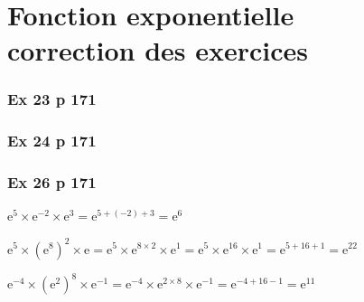 \documentclass[12pt,a4paper]{book}
\begin{document}
\graphicspath{{../images/}}
\setcounter{chapter}{6}
\chapter[Correction des exercices]{Fonction exponentielle \\ correction des exercices}
\thispagestyle{fancy}



\subsection*{Ex 23 p 171}

\subsection*{Ex 24 p 171}

\subsection*{Ex 26 p 171}
\begin{enumMet}
    \item $\mathrm{e}^{5} \times \mathrm{e}^{-2} \times \mathrm{e}^{3}=\mathrm{e}^{5+(-2)+3}=\mathrm{e}^{6}$
    \item $\mathrm{e}^{5} \times\left(\mathrm{e}^{8}\right)^{2} \times \mathrm{e}=\mathrm{e}^{5} \times \mathrm{e}^{8 \times 2} \times \mathrm{e}^{1}=\mathrm{e}^{5} \times \mathrm{e}^{16} \times \mathrm{e}^{1}=\mathrm{e}^{5+16+1}=\mathrm{e}^{22}$
    \item $\mathrm{e}^{-4} \times\left(\mathrm{e}^{2}\right)^{8} \times \mathrm{e}^{-1}=\mathrm{e}^{-4} \times \mathrm{e}^{2 \times 8} \times \mathrm{e}^{-1}=\mathrm{e}^{-4+16-1}=\mathrm{e}^{11}$
\end{enumMet}
\end{document}
